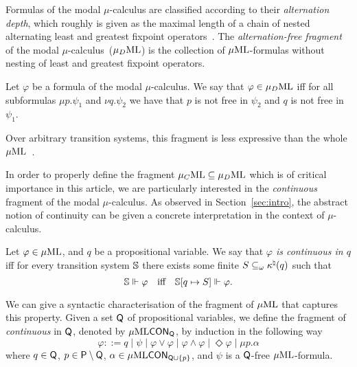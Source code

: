 \bigskip
Formulas of the modal $\mu$-calculus are classified according to their
\emph{alternation depth}, which roughly is given as the maximal length of
a chain of nested alternating least and greatest fixpoint operators~\cite{Niwinski86}.
The \emph{alternation-free fragment} of the modal $\mu$-calculus~($\mu_{D}\mathrm{ML}$) is the collection of
$\mu\mathrm{ML}$-formulas without nesting of least and greatest fixpoint operators.

\begin{definition}
  Let $\varphi$ be a formula of the modal $\mu$-calculus. We say that $\varphi\in\mu_{D}\mathrm{ML}$ iff for all subformulas $\mu p.\psi_1$ and $\nu q.\psi_2$ we have that $p$ is not free in $\psi_2$ and $q$ is not free in $\psi_1$.
\end{definition}

Over arbitrary transition systems, this fragment is
less expressive than the whole $\mu\mathrm{ML}$~\cite{Park79}. %

In order to properly define the fragment $\mu_{C}\mathrm{ML} \subseteq \mu_{D}\mathrm{ML}$ which is of critical importance in this article, we are particularly interested in the \emph{continuous} fragment of the modal $\mu$-calculus. As observed in Section~\ref{sec:intro}, the abstract notion of continuity can be given a concrete interpretation in the context of $\mu$-calculus.
%
\begin{definition}
Let $\varphi \in \mu\mathrm{ML}$, and $q$ be a propositional variable. We say that \emph{$\varphi$ is continuous in $q$} iff for every transition system $\mathbb{S}$ there exists some finite $S \subseteq_\omega \kappa^\natural(q)$ such that
$$
\model \mmodels \varphi \quad\text{iff}\quad \model[q \mapsto S] \mmodels \varphi .
$$
\end{definition}

We can give a syntactic characterisation of the fragment of $\mu\mathrm{ML}$ that captures this property. Given a set $\mathsf{Q}$ of propositional variables, we define the fragment of \MC \emph{continuous} in $\mathsf{Q}$, denoted by $\mu\mathrm{ML}\mathsf{CON}_{\mathsf{Q}}$, by induction in the following way
\begin{equation*}
   \varphi ::= q
   \mid \psi
   \mid \varphi \lor \varphi
   \mid \varphi \land \varphi
   \mid \Diamond \varphi
   \mid \mu p.\alpha
\end{equation*}
%
where $q \in \mathsf{Q}$, $p \in \mathsf{P} \setminus \mathsf{Q}$, $\alpha \in \mu\mathrm{ML}\mathsf{CON}_{\mathsf{Q}\cup\{p\}}$, and $\psi$ is a $\mathsf{Q}$-free $\mu\mathrm{ML}$-formula. 

